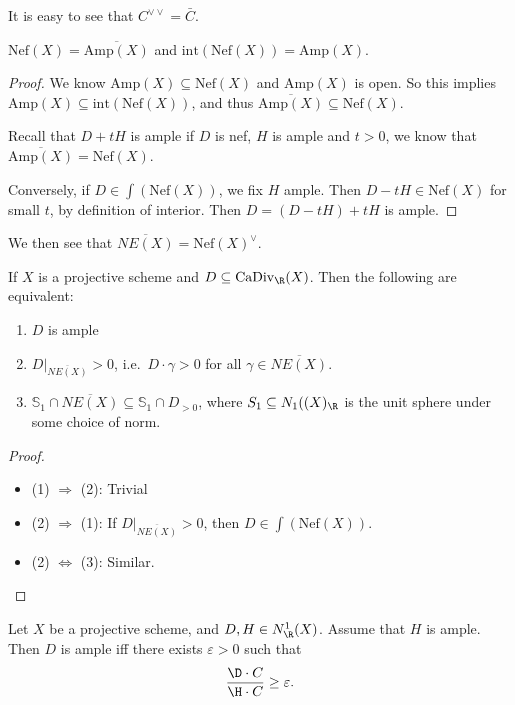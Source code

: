 \documentclass[a4paper]{article}
\newcommand\CaDiv{\mathrm{CaDiv}}
\newcommand\Amp{\mathrm{Amp}}
\newcommand\Nef{\mathrm{Nef}}
\begin{document}
It is easy to see that $C^{\vee \vee} = \bar{C}$.

\begin{prop}
  $\Nef(X) = \overline{\Amp(X)}$ and $\mathrm{int}(\Nef(X)) = \Amp(X)$.
\end{prop}

\begin{proof}
  We know $\Amp(X) \subseteq \Nef(X)$ and $\Amp(X)$ is open. So this implies $\Amp(X) \subseteq \mathrm{int}(\Nef(X))$, and thus $\overline{\Amp(X)} \subseteq \Nef(X)$.

  Recall that $D + tH$ is ample if $D$ is nef, $H$ is ample and $t > 0$, we know that $\overline{\Amp(X)} = \Nef(X)$.

  Conversely, if $D \in \int(\Nef(X))$, we fix $H$ ample. Then $D - tH \in \Nef(X)$ for small $t$, by definition of interior. Then $D = (D - tH) + tH$ is ample.
\end{proof}
We then see that $\overline{NE(X)} = \Nef(X)^\vee$.
\begin{thm}
  If $X$ is a projective scheme and $D \subseteq \CaDiv_\R(X)$. Then the following are equivalent:
  \begin{enumerate}
    \item $D$ is ample
    \item $D|_{\overline{NE(X)}} > 0$, i.e.\ $D \cdot \gamma > 0$ for all $\gamma \in \overline{NE(X)}$.
    \item $\mathbb{S}_1 \cap \overline{NE(X)} \subseteq \mathbb{S}_1 \cap D_{>0}$, where $S_1 \subseteq N_1((X)_\R$ is the unit sphere under some choice of norm.
  \end{enumerate}
\end{thm}

\begin{proof}\leavevmode
  \begin{itemize}
    \item (1) $\Rightarrow$ (2): Trivial
    \item (2) $\Rightarrow$ (1): If $D|_{\overline{NE(X)}} > 0$, then $D \in \int (\Nef(X))$.
    \item (2) $\Leftrightarrow$ (3): Similar.
  \end{itemize}
\end{proof}

\begin{thm}
  Let $X$ be a projective scheme, and $D, H \in N^1_\R(X)$. Assume that $H$ is ample. Then $D$ is ample iff there exists $\varepsilon > 0$ such that
  \[
    \frac{\D \cdot C}{\H \cdot C} \geq \varepsilon.
  \]
\end{thm}
\end{document}
